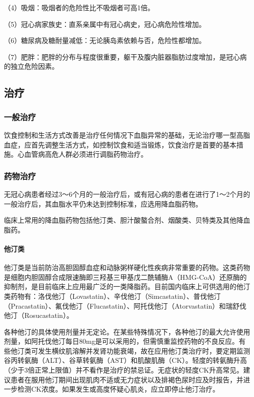 （4）吸烟：吸烟者的危险性比不吸烟者可高1倍。

（5）冠心病家族史：直系亲属中有冠心病史，冠心病危险性增加。

（6）糖尿病及糖耐量减低：无论胰岛素依赖与否，危险性都增加。

（7）肥胖：肥胖的分布与程度很重要，躯干及腹内脏器脂肪过度增加，是冠心病的独立危险因素。

\subsection{治疗}

\subsubsection{一般治疗}

饮食控制和生活方式改善是治疗任何情况下血脂异常的基础，无论治疗哪一型高脂血症，应首先调整生活方式，如控制饮食和适当锻炼，饮食治疗是首要的基本措施。心血管病高危人群必须进行调脂药物治疗。

\subsubsection{药物治疗}

无冠心病患者经过3～6个月的一般治疗后，或有冠心病的患者在进行了1～2个月的一般治疗后，其血脂水平仍未达到控制标准，应选用降血脂药物。

临床上常用的降血脂药物包括他汀类、胆汁酸螯合剂、烟酸类、贝特类及其他降血脂药。
\paragraph{他汀类}

他汀类是当前防治高胆固醇血症和动脉粥样硬化性疾病非常重要的药物。这类药物是细胞内胆固醇合成限速酶即三羟基三甲基戊二酰辅酶A（HMG-CoA）还原酶的抑制剂，是目前临床上应用最广泛的一类降脂药。目前国内临床上可供选用的他汀类药物有：洛伐他汀（Lovastatin）、辛伐他汀（Simcastatin）、普伐他汀（Pracastatin）、氟伐他汀（Flucastatin）、阿托伐他汀（Atorvastatin）和瑞舒伐他汀（Rosucastatin）。

各种他汀的具体使用剂量并无定论。在某些特殊情况下，各种他汀的最大允许使用剂量，如阿托伐他汀每日80mg是可以采用的，但需慎重监控药物的不良反应。有些他汀类可发生横纹肌溶解并发肾功能衰竭，故在应用他汀类治疗时，要定期监测谷丙转氨酶（ALT）、谷草转氨酶（AST）和肌酸肌酶（CK）。轻度的转氨酶升高（少于3倍正常上限值）并不看作是治疗的禁忌证。无症状的轻度CK升高常见。建议患者在服用他汀期间出现肌肉不适或无力症状以及排褐色尿时应及时报告，并进一步检测CK浓度。如果发生或高度怀疑心肌炎，应立即停止他汀治疗。
